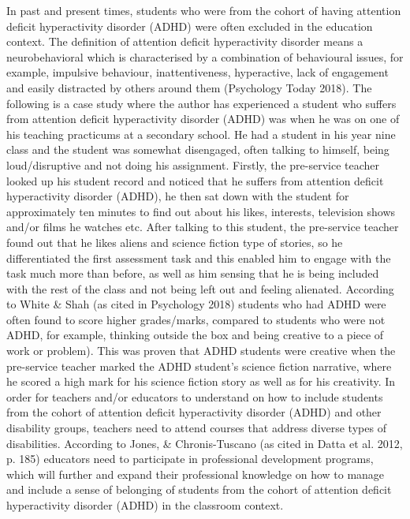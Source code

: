 \documentclass[twoside,12pt,a4paper,notitlepage]{memoir}
\begin{document}
In past and present times, students who were from the cohort of having attention deficit hyperactivity disorder (ADHD) were often excluded in the education context. The definition of attention deficit hyperactivity disorder means a neurobehavioral which is characterised by a combination of behavioural issues, for example, impulsive behaviour, inattentiveness, hyperactive, lack of engagement and easily distracted by others around them (Psychology Today 2018). The following is a case study where the author has experienced a student who suffers from attention deficit hyperactivity disorder (ADHD) was when he was on one of his teaching practicums at a secondary school. He had a student in his year nine class and the student was somewhat disengaged, often talking to himself, being loud/disruptive and not doing his assignment. Firstly, the pre-service teacher looked up his student record and noticed that he suffers from attention deficit hyperactivity disorder (ADHD), he then sat down with the student for approximately ten minutes to find out about his likes, interests, television shows and/or films he watches etc. After talking to this student, the pre-service teacher found out that he likes aliens and science fiction type of stories, so he differentiated the first assessment task and this enabled him to engage with the task much more than before, as well as him sensing that he is being included with the rest of the class and not being left out and feeling alienated. According to White \& Shah (as cited in Psychology 2018) students who had ADHD were often found to score higher grades/marks, compared to students who were not ADHD, for example, thinking outside the box and being creative to a piece of work or problem). This was proven that ADHD students were creative when the pre-service teacher marked the ADHD student’s science fiction narrative, where he scored a high mark for his science fiction story as well as for his creativity.
In order for teachers and/or educators to understand on how to include students from the cohort of attention deficit hyperactivity disorder (ADHD) and other disability groups, teachers need to attend courses that address diverse types of disabilities. According to Jones, \& Chronis-Tuscano (as cited in Datta et al. 2012, p. 185) educators need to participate in professional development programs, which will further and expand their professional knowledge on how to manage and include a sense of belonging of students from the cohort of attention deficit hyperactivity disorder (ADHD) in the classroom context.
\end{document}
